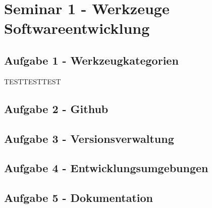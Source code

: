 	
\section{Seminar 1 - Werkzeuge Softwareentwicklung}

	\subsection{Aufgabe 1 - Werkzeugkategorien}
	
	TESTTESTTEST
	
	\subsection{Aufgabe 2 - Github}
	
	\subsection{Aufgabe 3 - Versionsverwaltung}
	
	\subsection{Aufgabe 4 - Entwicklungsumgebungen}
	
	\subsection{Aufgabe 5 - Dokumentation}
	
